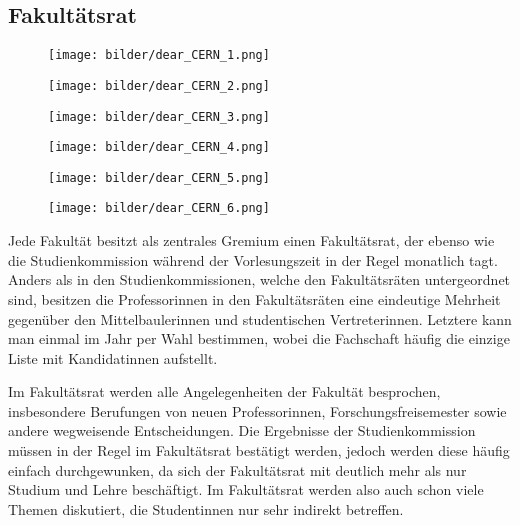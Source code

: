 \vspace{-3mm}

\subsection{Fakultätsrat}

\begin{figure*}[b]
    \centering
    \begin{subfigure}{.3\textwidth}
	\texttt{[image: bilder/dear\_CERN\_1.png]}
	\vspace{7mm}
    \end{subfigure}
    \begin{subfigure}{.3\textwidth}
	\texttt{[image: bilder/dear\_CERN\_2.png]}
	\vspace{7mm}
    \end{subfigure}
    \begin{subfigure}{.3\textwidth}
	\texttt{[image: bilder/dear\_CERN\_3.png]}
	\vspace{7mm}
    \end{subfigure}
    \begin{subfigure}{.3\textwidth}
	\texttt{[image: bilder/dear\_CERN\_4.png]}
    \end{subfigure}
    \begin{subfigure}{.3\textwidth}
	\texttt{[image: bilder/dear\_CERN\_5.png]}
    \end{subfigure}
    \begin{subfigure}{.3\textwidth}
	\texttt{[image: bilder/dear\_CERN\_6.png]}
    \end{subfigure}
\end{figure*}

Jede Fakultät besitzt als zentrales Gremium einen Fakultätsrat, der ebenso wie die Studienkommission während der Vorlesungszeit in der Regel monatlich tagt. Anders als in den Studienkommissionen, welche den Fakultätsräten untergeordnet sind, besitzen die Professorinnen in den Fakultätsräten eine eindeutige Mehrheit gegenüber den Mittelbaulerinnen und studentischen Vertreterinnen. Letztere kann man einmal im Jahr per Wahl bestimmen, wobei die Fachschaft häufig die einzige Liste mit Kandidatinnen aufstellt.

Im Fakultätsrat werden alle Angelegenheiten der Fakultät besprochen, insbesondere Berufungen von neuen Professorinnen, Forschungsfreisemester sowie andere wegweisende Entscheidungen. Die Ergebnisse der Studienkommission müssen in der Regel im Fakultätsrat bestätigt werden, jedoch werden diese häufig einfach durchgewunken, da sich der Fakultätsrat mit deutlich mehr als nur Studium und Lehre beschäftigt. Im Fakultätsrat werden also auch schon viele Themen diskutiert, die Studentinnen nur sehr indirekt betreffen.

